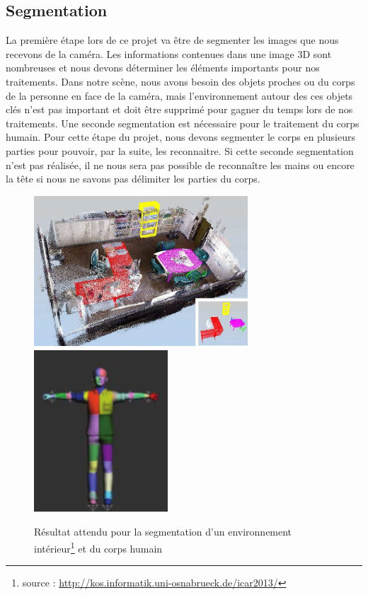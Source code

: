 \subsection{Segmentation}
La première étape lors de ce projet va être de segmenter les images que nous recevons de 
la caméra. Les informations contenues dans une image 3D sont nombreuses et nous devons
déterminer les éléments importants pour nos traitements. Dans notre scène,
nous avons besoin des objets proches ou du corps de la personne en face de la caméra, mais 
l'environnement autour des ces objets clés n'est pas important et doit être supprimé pour
gagner du temps lors de nos traitements.
Une seconde segmentation est nécessaire pour le traitement du corps humain. Pour cette étape du projet,
nous devons segmenter le corps en plusieurs parties pour pouvoir, par la suite, les reconnaitre. Si cette
seconde segmentation n'est pas réalisée, il ne nous sera pas possible de reconnaître les mains ou encore
la tête si nous ne savons pas délimiter les parties du corps.  

\begin{figure}[!ht]
  \begin{center}
    \includegraphics[width=8cm]{image/segmentation.png}
    \includegraphics[width=5cm]{image/bodySegmentation.png}
    \caption[The LOF caption]{Résultat attendu pour la segmentation d'un environnement intérieur\footnote{source : \url{http://kos.informatik.uni-osnabrueck.de/icar2013/}} et du corps humain}
  \end{center}
\end{figure}
 
